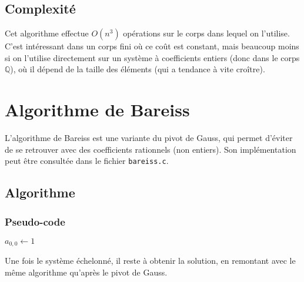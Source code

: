 \documentclass[french]{article}
\begin{document}
\subsection{Complexité}
Cet algorithme effectue $O(n^3)$ opérations sur le corps dans lequel on l'utilise. C'est intéressant dans un corps fini où ce coût est constant, mais beaucoup moins si on l'utilise directement sur un système à coefficients entiers (donc dans le corps $\mathbb{Q}$), où il dépend de la taille des éléments (qui a tendance à vite croître).
\vspace{16cm}
\section{Algorithme de Bareiss} \label{sec:bareiss}
L'algorithme de Bareiss est une variante du pivot de Gauss, qui permet d'éviter de se retrouver avec des coefficients rationnels (non entiers). Son implémentation peut être consultée dans le fichier {\tt bareiss.c}.
\subsection{Algorithme}
\subsubsection{Pseudo-code}
\begin{algorithm}[H]
	\DontPrintSemicolon
	$a_{0,0} \gets 1$
\end{algorithm}
\leavevmode \newline
Une fois le système échelonné, il reste à obtenir la solution, en remontant avec le même algorithme qu'après le pivot de Gauss.
\end{document}
